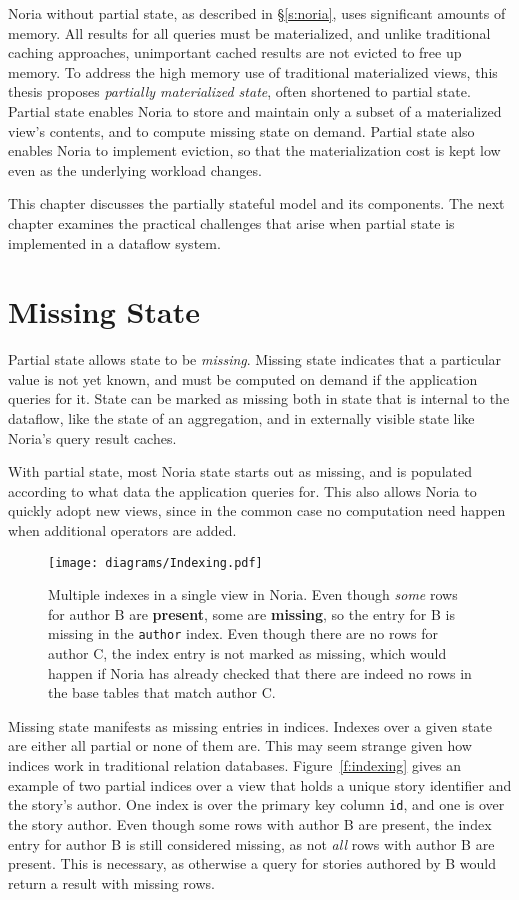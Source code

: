 Noria without partial state, as described in \S\ref{s:noria}, uses significant
amounts of memory. All results for all queries must be materialized, and unlike
traditional caching approaches, unimportant cached results are not evicted to
free up memory. To address the high memory use of traditional materialized
views, this thesis proposes \textit{partially materialized state}, often
shortened to partial state. Partial state enables Noria to store and maintain
only a subset of a materialized view's contents, and to compute missing state on
demand. Partial state also enables Noria to implement eviction, so that the
materialization cost is kept low even as the underlying workload changes.

This chapter discusses the partially stateful model and its components. The next
chapter examines the practical challenges that arise when partial state is
implemented in a dataflow system.

\section{Missing State}
\label{s:missing}

Partial state allows state to be \textit{missing}. Missing state indicates that
a particular value is not yet known, and must be computed on demand if the
application queries for it. State can be marked as missing both in state that is
internal to the dataflow, like the state of an aggregation, and in externally
visible state like Noria's query result caches.

With partial state, most Noria state starts out as missing, and is populated
according to what data the application queries for. This also allows Noria to
quickly adopt new views, since in the common case no computation need happen
when additional operators are added.

\begin{figure}
  \centering
  \texttt{[image: diagrams/Indexing.pdf]}
  \caption{Multiple indexes in a single view in Noria. Even though \emph{some}
  rows for author B are \textbf{\color{set3}present}, some are
  \textbf{\color{set2}missing}, so the entry for B is missing in the
  \texttt{author} index. Even though there are no rows for author C, the index
  entry is not marked as missing, which would happen if Noria has already
  checked that there are indeed no rows in the base tables that match author C.}
  \label{f:indexing}
\end{figure}

Missing state manifests as missing entries in indices. Indexes over a given
state are either all partial or none of them are. This may seem strange given
how indices work in traditional relation databases. Figure~\vref{f:indexing}
gives an example of two partial indices over a view that holds a unique story
identifier and the story's author. One index is over the primary key column
\texttt{id}, and one is over the story author. Even though some rows with author
B are present, the index entry for author B is still considered missing, as not
\emph{all} rows with author B are present. This is necessary, as otherwise a
query for stories authored by B would return a result with missing rows.

